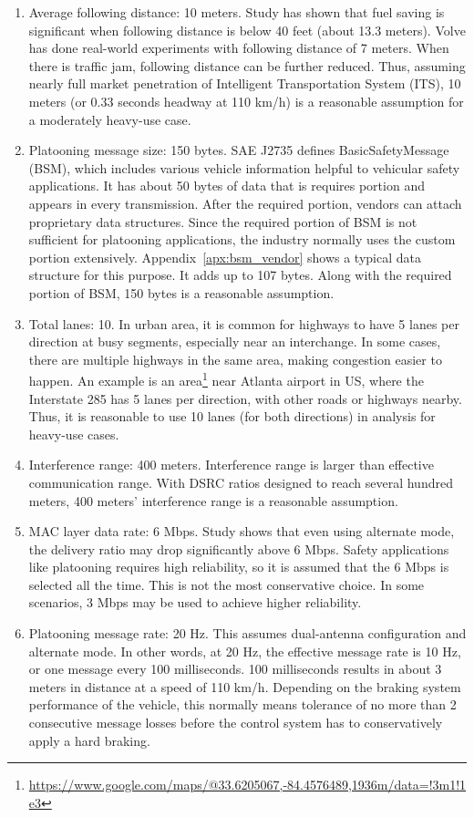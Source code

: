 \documentclass[12pt]{report}
\begin{document}
\begin{enumerate}
  \item Average following distance: 10 meters. Study \cite{watts2015computational} has shown that fuel saving is significant when following distance is below 40 feet (about 13.3 meters). Volve \cite{volvo2015} has done real-world experiments with following distance of 7 meters. When there is traffic jam, following distance can be further reduced. Thus, assuming nearly full market penetration of Intelligent Transportation System (ITS), 10 meters (or 0.33 seconds headway at 110 km/h) is a reasonable assumption for a moderately heavy-use case.
  \item Platooning message size: 150 bytes. SAE J2735 defines BasicSafetyMessage (BSM), which includes various vehicle information helpful to vehicular safety applications. It has about 50 bytes of data that is requires portion and appears in every transmission. After the required portion, vendors can attach proprietary data structures. Since the required portion of BSM is not sufficient for platooning applications, the industry normally uses the custom portion extensively. Appendix~\ref{apx:bsm_vendor} shows a typical data structure for this purpose. It adds up to 107 bytes. Along with the required portion of BSM, 150 bytes is a reasonable assumption.
  \item Total lanes: 10. In urban area, it is common for highways to have 5 lanes per direction at busy segments, especially near an interchange. In some cases, there are multiple highways in the same area, making congestion easier to happen. An example is an area\footnote{\url{https://www.google.com/maps/@33.6205067,-84.4576489,1936m/data=!3m1!1e3}} near Atlanta airport in US, where the Interstate 285 has 5 lanes per direction, with other roads or highways nearby. Thus, it is reasonable to use 10 lanes (for both directions) in analysis for heavy-use cases.
  \item Interference range: 400 meters. Interference range is larger than effective communication range. With DSRC ratios designed to reach several hundred meters, 400 meters' interference range is a reasonable assumption.
  \item MAC layer data rate: 6 Mbps. Study \cite{songDSRC2016} shows that even using alternate mode, the delivery ratio may drop significantly above 6 Mbps. Safety applications like platooning requires high reliability, so it is assumed that the 6 Mbps is selected all the time. This is not the most conservative choice. In some scenarios, 3 Mbps may be used to achieve higher reliability.
  \item Platooning message rate: 20 Hz. This assumes dual-antenna configuration and alternate mode. In other words, at 20 Hz, the effective message rate is 10 Hz, or one message every 100 milliseconds. 100 milliseconds results in about 3 meters in distance at a speed of 110 km/h. Depending on the braking system performance of the vehicle, this normally means tolerance of no more than 2 consecutive message losses before the control system has to conservatively apply a hard braking.
\end{enumerate}
\end{document}
